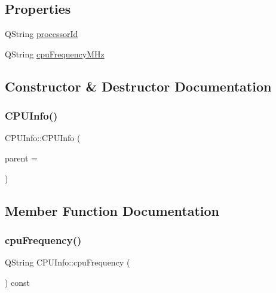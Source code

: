 \subsection*{Properties}
\begin{DoxyCompactItemize}
\item 
Q\+String \hyperlink{class_c_p_u_info_a63925ca12a5c5841a265566132461efc}{processor\+Id}
\item 
Q\+String \hyperlink{class_c_p_u_info_a08eacbffc7b4726058d011b966cd05b5}{cpu\+Frequency\+M\+Hz}
\end{DoxyCompactItemize}


\subsection{Constructor \& Destructor Documentation}
\mbox{\label{class_c_p_u_info_ae64d136af2ac562ebad60497c9c20afa}} 
\subsubsection{\texorpdfstring{C\+P\+U\+Info()}{CPUInfo()}}
{\footnotesize\ttfamily C\+P\+U\+Info\+::\+C\+P\+U\+Info (\begin{DoxyParamCaption}\item[{Q\+Object $\ast$}]{parent = {} }\end{DoxyParamCaption})\hspace{0.3cm}{\ttfamily [explicit]}}



\subsection{Member Function Documentation}
\mbox{\label{class_c_p_u_info_a5d8ffb64c8cca2b5867a4a460a0179ae}} 
\subsubsection{\texorpdfstring{cpu\+Frequency()}{cpuFrequency()}}
{\footnotesize\ttfamily Q\+String C\+P\+U\+Info\+::cpu\+Frequency (\begin{DoxyParamCaption}{ }\end{DoxyParamCaption}) const}


